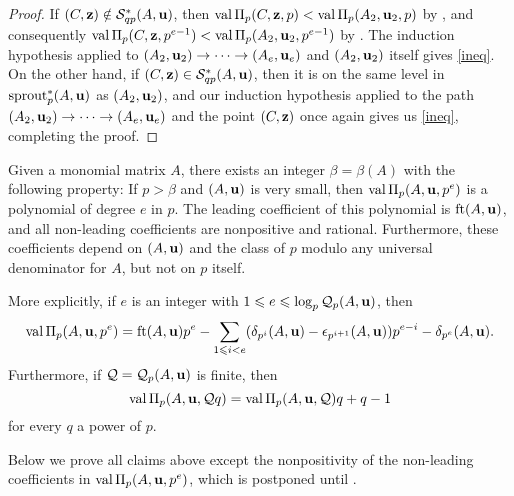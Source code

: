 \documentclass{amsart}
\begin{document}
\begin{proof}
   If $(C,\mathbf{z}) \notin \mathcal{S}^{\ast}_{qp}(A,\mathbf{u})$, then $\operatorname{val} \Pi_p(C,\mathbf{z}, p)< \operatorname{val} \Pi_p(A_2, \mathbf{u}_2, p)$ by , and consequently $\operatorname{val} \Pi_p(C, \mathbf{z},p^{e-1}) < \operatorname{val}\Pi_p(A_2,\mathbf{u}_2, p^{e-1})$ by .
   The induction hypothesis applied to $(A_2, \mathbf{u}_2) \to \cdots \to (A_e, \mathbf{u}_e)$ and $(A_2,\mathbf{u}_2)$ itself gives \eqref{ineq}.
   On the other hand, if $(C, \mathbf{z}) \in \mathcal{S}^{\ast}_{qp}(A,\mathbf{u})$, then it is on the same level in $\operatorname{sprout}_p^{\ast}(A,\mathbf{u})$ as $(A_2, \mathbf{u}_2)$, and  our induction hypothesis applied to the path $(A_2, \mathbf{u}_2) \to \cdots \to (A_e, \mathbf{u}_e)$ and the point $(C, \mathbf{z})$ once again gives us \eqref{ineq}, completing the proof.
\end{proof}

\begin{theorem}
   \label{main theorem wrt diagonal: T}
   Given a monomial matrix $A$, there exists an integer $\beta = \beta(A)$ with the following property\textup:
   If $p > \beta$ and $(A,\mathbf{u})$ is very small, then $\operatorname{val} \Pi_p(A,\mathbf{u},p^e)$ is a polynomial of degree $e$ in $p$.
   The leading coefficient of this polynomial is $\operatorname{ft}(A, \mathbf{u})$, and all non-leading coefficients are nonpositive and rational.
   Furthermore, these coefficients depend on $(A,\mathbf{u})$ and the class of $p$ modulo any universal denominator for $A$, but not on $p$ itself.

   More explicitly, if $e$ is an integer with $1 \leqslant e \leqslant \log_p \mathcal{Q}_p(A,\mathbf{u})$, then
   \[
      \operatorname{val} \Pi_p(A,\mathbf{u}, p^e) =  \operatorname{ft}(A, \mathbf{u})  p^e - \sum_{1 \leqslant i < e} ( \delta_{p^i}(A,\mathbf{u}) - \epsilon_{p^{i+1}}(A,\mathbf{u}))  p^{e-i} - \delta_{p^e}(A,\mathbf{u}).
   \]
   Furthermore, if $\mathcal{Q} = \mathcal{Q}_p(A,\mathbf{u})$ is finite, then
   \[
      \operatorname{val} \Pi_p(A,\mathbf{u}, \mathcal{Q} q) = \operatorname{val} \Pi_p(A,\mathbf{u}, \mathcal{Q})  q + q-1
   \]
   for every $q$ a power of $p$.
\end{theorem}

Below we prove all claims above except the nonpositivity of the non-leading coefficients in $\operatorname{val} \Pi_p(A,\mathbf{u},p^e)$, which is postponed until .
\end{document}
